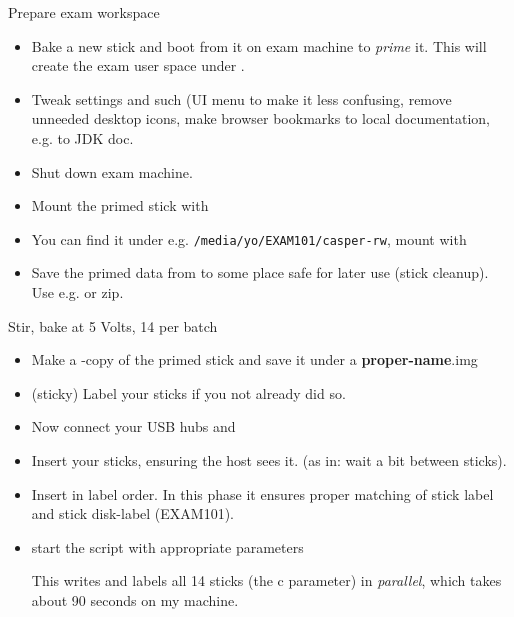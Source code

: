 \begin{frame}{Prepare exam workspace}

  \begin{itemize}
  \item Bake a new stick and boot from it on exam machine to \textit{prime} it. This
    will create the exam user space under .
  \item Tweak settings and such (UI menu to make it less confusing,
    remove unneeded desktop icons, make browser bookmarks to local
    documentation, e.g. to JDK doc.
  \item Shut down exam machine.
  \item Mount the primed stick with 
    
  \item You can find it  under
    e.g. \texttt{/media/yo/EXAM101/casper-rw}, mount with \\
  \item Save the primed data  from  to some place safe
    for later use (stick cleanup). Use e.g.  or zip.
\end{itemize}
\end{frame}

\begin{frame}[shrink]{Stir, bake at 5 Volts, 14 per batch}
  \begin{itemize}
  \item Make a -copy of the primed stick and save it under a
    {\ttfamily\textbf{proper-name}.img}
    
  \item (sticky) Label your sticks if you not already did so.
  \item Now connect your USB hubs and
  \item Insert your sticks, ensuring the host sees it. (as in: wait a
    bit between sticks).
  \item Insert in label
    order. In this phase it ensures proper matching of stick label and
    stick disk-label (EXAM101).
  \item start the  script with appropriate parameters
    
    This writes and labels all 14 sticks (the c parameter) in \textit{parallel},
    which takes about 90 seconds on my machine.
  \end{itemize}
\end{frame}

